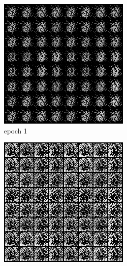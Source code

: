 \documentclass[a4paper]{article}
\theoremstyle{definition}
\newenvironment{soln}{
	\leavevmode\color{blue}\ignorespaces
}{}
\begin{document}
\begin{enumerate} [label=(\alph*)]
\begin{soln}
			\begin{figure}[H]
				\centering
				\begin{subfigure}[b]{0.3\textwidth}
					\centering
					\includegraphics[width=\textwidth]{../figs/new_loss_gen_img1.png}
					\caption{epoch 1}
				\end{subfigure}
				\hfill
				\begin{subfigure}[b]{0.3\textwidth}
					\centering
					\includegraphics[width=\textwidth]{../figs/new_loss_gen_img50.png}

\end{subfigure}
\end{figure}
\end{soln}
\end{enumerate}
\end{document}
